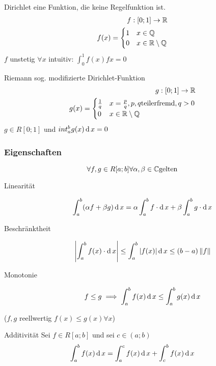 \begin{Bsp}{Dirichlet}
  eine Funktion, die keine Regelfunktion ist.
  \begin{align*}
    f:[0;1]\to\mathbb{R}\\
    f(x)=\begin{cases}
      1 & x\in \mathbb{Q}\\
      0 & x\in \mathbb{R}\setminus\mathbb{Q}
    \end{cases}
  \end{align*}
  $f$ unstetig $\forall x$ intuitiv: $\int^1_0 f(x)fx =0$
\end{Bsp}
\begin{Bsp}{Riemann}
  sog. modifizierte Dirichlet-Funktion
  \begin{align*}
    g:[0;1]\to\mathbb{R}\\
    g(x)=\begin{cases}
      \frac{1}{q}  & x=\frac{p}{q}, p,q \text{teilerfremd}, q>0\\
      0 & x\in \mathbb{R}\setminus \mathbb{Q}
    \end{cases}
  \end{align*}
  $g\in R[0;1]$ und $int^b_ag(x)\operatorname{d} x=0$
\end{Bsp}
\subsubsection{Eigenschaften}
\begin{Sat}
  \[\forall f, g\in R [a;b] \forall \alpha,\beta\in \mathbb{C} \text{gelten}\]
  \begin{description}
    \item[Linearität] \[\int^b_a(\alpha f+ \beta g)\operatorname{d} x = \alpha \int^b_af\cdot \operatorname{d} x+\beta\int^b_a g\cdot \operatorname{d} x\]
    \item[Beschränktheit] \[\left| \int^b_a f(x)\cdot \operatorname{d} x \right|\leq \int^b_a\left| f(x) \right|\operatorname{d} x\leq (b-a)\left\| f \right\|\]
    \item[Monotonie] \[f\leq g \implies \int^b_af(x)\operatorname{d} x\leq \int^b_ag(x)\operatorname{d} x\]
  \end{description}
  ($f,g$ reellwertig $f(x)\leq g(x)\forall x$)
\end{Sat}
\begin{Sat}{Additivität}
  Sei $f\in R[a;b]$ und sei $c\in (a;b)$
  \[\int^b_af(x)\operatorname{d} x=\int^c_a f(x)\operatorname{d} x+\int^b_cf(x)\operatorname{d} x\]
\end{Sat}
